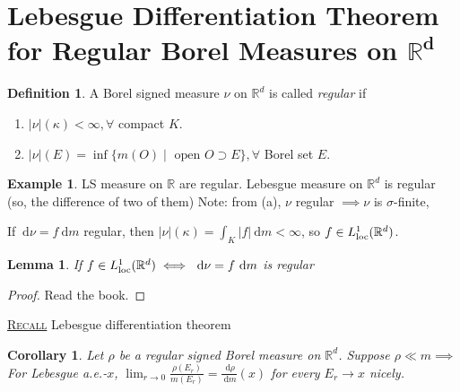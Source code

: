 \documentclass{report}
\newcommand{\R}{\mathbb{R}}
\newcommand{\df}{\ \mathrm{d}}
\newcommand{\fancyem}[1]{\underline{\textsc{#1}}}
\newtheorem{corollary}[theorem]{Corollary}
\newtheorem{lemma}[theorem]{Lemma}
\theoremstyle{definition}
\newtheorem{definition}[theorem]{Definition}
\newtheorem{example}[theorem]{Example}
\theoremstyle{remark}
\newcommand*\ttlmath[2]{\texorpdfstring{$\boldsymbol{#1}$}{#2}}
\begin{document}
\section{Lebesgue Differentiation Theorem for Regular Borel Measures on \ttlmath{\R^d}{R\textasciicircum d}}
\cite[p. 99]{follandRealAnalysisModern1999}
\begin{definition}
	A Borel signed measure $\nu$ on $\R^d$ is called \emph{regular} if \begin{enumerate}
		\item $|\nu|(\kappa) < \infty, \forall$ compact $K$.
		\item $|\nu|(E) = \inf\{ m(O) \mid \text{ open } O \supset E\}, \forall $ Borel set $E$.
	\end{enumerate}
\end{definition}
\begin{example}
	LS measure on $\R$ are regular. Lebesgue measure on $\R^d$ is regular (so, the difference of two of them) Note: from (a), $\nu$ regular $\implies \nu$ is $\sigma$-finite,

	If $\df \nu = f \df m$ regular, then $|\nu|(\kappa) = \int_K |f| \df m < \infty$, so $f \in L^1_\textup{loc}(\R^d)$.
\end{example}

\begin{lemma}
	If $f \in L^1_\textup{loc}(\R^d) \iff \df \nu = f \df m$ is regular
\end{lemma}
\begin{proof}
	Read the book.
\end{proof}

\fancyem{Recall} Lebesgue differentiation theorem

\begin{corollary}
	Let $\rho$ be a \emph{regular} signed Borel measure on $\R^d$. Suppose $\rho \ll m \implies$ For Lebesgue a.e.-$x$, $\lim_{r \to 0}\frac{\rho(E_r)}{m(E_r)} = \frac{\df \rho}{\df m}(x)$ for every $E_r \to x$ nicely. 
\end{corollary}
\end{document}
